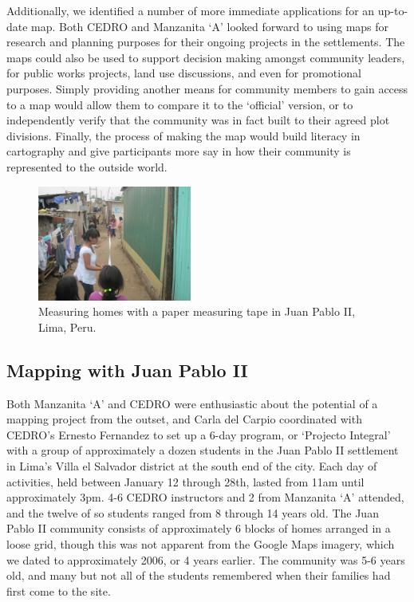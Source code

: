 \documentclass[11pt,oneside,notitlepage]{report}
\begin{document}
Additionally, we identified a number of more immediate applications for an up-to-date map. Both \ac{CEDRO} and Manzanita `A' looked forward to using maps for research and planning purposes for their ongoing projects in the settlements. The maps could also be used to support decision making amongst community leaders, for public works projects, land use discussions, and even for promotional purposes. Simply providing another means for community members to gain access to a map would allow them to compare it to the `official' version, or to independently verify that the community was in fact built to their agreed plot divisions. Finally, the process of making the map would build literacy in cartography and give participants more say in how their community is represented to the outside world.  

\begin{figure}
	\begin{flushright}
		\includegraphics[width=0.45\textwidth]{images/juan-pablo-measuring.jpg}
		\caption{Measuring homes with a paper measuring tape in Juan Pablo II, Lima, Peru.}
	\end{flushright}
\end{figure}

\subsection{Mapping with Juan Pablo II}

Both Manzanita `A' and \ac{CEDRO} were enthusiastic about the potential of a mapping project from the outset, and Carla del Carpio coordinated with \ac{CEDRO}'s Ernesto Fernandez to set up a 6-day program, or `Projecto Integral' with a group of approximately a dozen students in the Juan Pablo II settlement in Lima's Villa el Salvador district at the south end of the city. Each day of activities, held between January 12 through 28th, lasted from 11am until approximately 3pm. 4-6 \ac{CEDRO} instructors and 2 from Manzanita `A' attended, and the twelve of so students ranged from 8 through 14 years old. The Juan Pablo II community consists of approximately 6 blocks of homes arranged in a loose grid, though this was not apparent from the Google Maps imagery, which we dated to approximately 2006, or 4 years earlier. The community was 5-6 years old, and many but not all of the students remembered when their families had first come to the site. 
\end{document}

